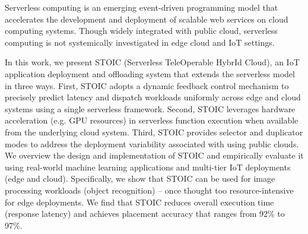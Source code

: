 Serverless computing is an emerging event-driven programming model that accelerates the development and deployment of scalable web services on cloud computing systems. Though widely integrated with public cloud, serverless computing is not systemically investigated in edge cloud and IoT settings.

In this work, we present STOIC (Serverless TeleOperable HybrId Cloud), an IoT application deployment and offloading system that extends the serverless model in three ways. First, STOIC adopts a dynamic feedback control mechanism to precisely predict latency and dispatch workloads uniformly across edge and cloud systems using a single serverless framework. Second, STOIC leverages hardware acceleration (e.g. GPU resources) in serverless function execution when available from the underlying cloud system. Third, STOIC provides selector and duplicator modes to address the deployment variability associated with using public clouds. We overview the design and implementation of STOIC and empirically evaluate it using real-world machine learning applications and multi-tier IoT deployments (edge and cloud). Specifically, we show that STOIC can be used for image processing workloads (object recognition) -- once thought too resource-intensive for edge deployments. We find that STOIC reduces overall execution time (response latency) and achieves placement accuracy that ranges from 92\% to 97\%.
